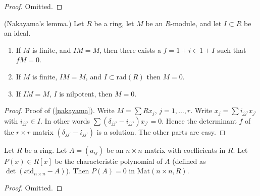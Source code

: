 \begin{proof}
Omitted.
\end{proof}

\begin{lemma}
\label{lemma-NAK}
(Nakayama's lemma.)
Let $R$ be a ring, let $M$ be an $R$-module, and let $I \subset R$
be an ideal.
\begin{enumerate}
\item If $M$ is finite, and $IM = M$, then there exists a
$f = 1+i \in 1 + I$ such that $fM = 0$.
\label{nakayama}
\item If $M$ is finite, $IM = M$, and $I \subset \text{rad}(R)$
then $M=0$.
\item If $IM=M$, $I$ is nilpotent, then $M=0$.
\end{enumerate}
\end{lemma}

\begin{proof}
Proof of (\ref{nakayama}).
Write $M = \sum Rx_j$, $j=1,\ldots,r$. Write $x_j = \sum i_{jj'} x_{j'}$ with
$i_{jj'} \in I$.  In other words $\sum (\delta_{jj'} - i_{jj'})x_{j'} = 0$.
Hence the determinant $f$ of the $r\times r$ matrix
$(\delta_{jj'} - i_{jj'})$ is a solution. The other parts are easy.
\end{proof}


\begin{lemma}
\label{lemma-charpoly}
Let $R$ be a ring. Let $A = (a_{ij})$ be an $n\times n$
matrix with coefficients in $R$. Let $P(x) \in R[x]$
be the characteristic polynomial of $A$ (defined
as $\det(x\text{id}_{n\times n} - A)$).
Then $P(A) = 0$ in $\text{Mat}(n\times n, R)$.
\end{lemma}

\begin{proof}
Omitted.
\end{proof}








